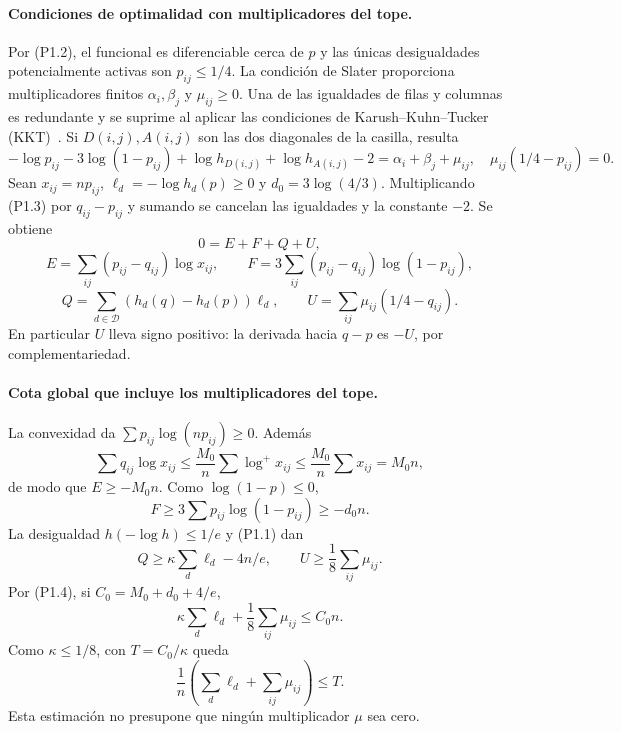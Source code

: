 \paragraph{Condiciones de optimalidad con multiplicadores del tope.}
Por (P1.2), el funcional es diferenciable cerca de $p$ y las únicas desigualdades
potencialmente activas son $p_{ij}\le1/4$.
La condición de Slater proporciona multiplicadores finitos $\alpha_i,\beta_j$ y
$\mu_{ij}\ge0$. Una de las igualdades de filas y columnas es redundante y se suprime
al aplicar las condiciones de Karush--Kuhn--Tucker (KKT)~\cite[cap.~5]{BV}. Si $D(i,j),A(i,j)$ son las
dos diagonales de la casilla, resulta
\[
 -\log p_{ij}-3\log(1-p_{ij})+\log h_{D(i,j)}+\log h_{A(i,j)}-2
 =\alpha_i+\beta_j+\mu_{ij},\quad
 \mu_{ij}(1/4-p_{ij})=0.                          \tag{P1.3}
\]
Sean $x_{ij}=np_{ij}$, $\ell_d=-\log h_d(p)\ge0$ y
$d_0=3\log(4/3)$. Multiplicando (P1.3) por $q_{ij}-p_{ij}$ y
sumando se cancelan las igualdades y la constante $-2$. Se obtiene
\[
 0=E+F+Q+U,                                      \tag{P1.4}
\]
\[
 E=\sum_{ij}(p_{ij}-q_{ij})\log x_{ij},\qquad
 F=3\sum_{ij}(p_{ij}-q_{ij})\log(1-p_{ij}),
\]
\[
 Q=\sum_{d\in\mathcal D}(h_d(q)-h_d(p))\ell_d,\qquad
 U=\sum_{ij}\mu_{ij}(1/4-q_{ij}).
\]
En particular $U$ lleva signo positivo: la derivada hacia $q-p$
es $-U$, por complementariedad.

\paragraph{Cota global que incluye los multiplicadores del tope.}
La convexidad da $\sum p_{ij}\log(np_{ij})\ge0$. Además
\[
 \sum q_{ij}\log x_{ij}\le\frac{M_0}{n}\sum\log^+x_{ij}
 \le\frac{M_0}{n}\sum x_{ij}=M_0n,
\]
de modo que $E\ge-M_0n$. Como $\log(1-p)\le0$,
\[
 F\ge3\sum p_{ij}\log(1-p_{ij})\ge-d_0n.
\]
La desigualdad $h(-\log h)\le1/e$ y (P1.1) dan
\[
 Q\ge\kappa\sum_d\ell_d-4n/e,\qquad
 U\ge\frac18\sum_{ij}\mu_{ij}.
\]
Por (P1.4), si $C_0=M_0+d_0+4/e$,
\[
 \kappa\sum_d\ell_d+\frac18\sum_{ij}\mu_{ij}\le C_0n.
\]
Como $\kappa\le1/8$, con $T=C_0/\kappa$ queda
\[
 \frac1n\left(\sum_d\ell_d+\sum_{ij}\mu_{ij}\right)\le T.    \tag{P1.5}
\]
Esta estimación no presupone que ningún multiplicador $\mu$ sea cero.
